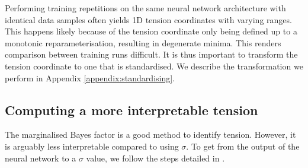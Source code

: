 \documentclass[%
 reprint,
 amsmath,amssymb,
 aps,
]{revtex4-2}
\begin{document}
Performing training repetitions on the same neural network architecture with identical data samples often yields 1D tension coordinates with varying ranges. This happens likely because of the tension coordinate only being defined up to a monotonic reparameterisation, resulting in degenerate minima. This renders comparison between training runs difficult. It is thus important to transform the tension coordinate to one that is standardised. We describe the transformation we perform in Appendix \ref{appendix:standardising}.




\subsection{Computing a more interpretable tension}

The marginalised Bayes factor is a good method to identify tension. However, it is arguably less interpretable compared to using $\sigma$. To get from the output of the neural network to a $\sigma$ value, we follow the steps detailed in \cite{Handley2021}. 
\end{document}
